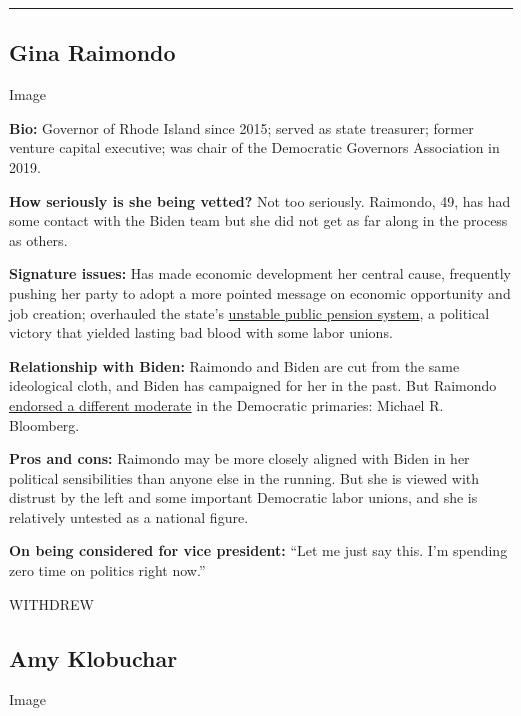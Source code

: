 \begin{center}\rule{0.5\linewidth}{\linethickness}\end{center}

\hypertarget{gina-raimondo}{%
\subsection{Gina Raimondo}\label{gina-raimondo}}

Image

\textbf{Bio:} Governor of Rhode Island since 2015; served as state
treasurer; former venture capital executive; was chair of the Democratic
Governors Association in 2019.

\textbf{How seriously is she being vetted?} Not too seriously. Raimondo,
49, has had some contact with the Biden team but she did not get as far
along in the process as others.

\textbf{Signature issues:} Has made economic development her central
cause, frequently pushing her party to adopt a more pointed message on
economic opportunity and job creation; overhauled the state's
\href{https://www.nytimes.com/2015/09/26/business/dealbook/rhode-island-averts-pension-disaster-without-raising-taxes.html}{unstable
public pension system}, a political victory that yielded lasting bad
blood with some labor unions.

\textbf{Relationship with Biden:} Raimondo and Biden are cut from the
same ideological cloth, and Biden has campaigned for her in the past.
But Raimondo
\href{https://www.nytimes.com/2019/11/24/us/politics/michael-bloomberg-2020-presidency.html}{endorsed
a different moderate} in the Democratic primaries: Michael R. Bloomberg.

\textbf{Pros and cons:} Raimondo may be more closely aligned with Biden
in her political sensibilities than anyone else in the running. But she
is viewed with distrust by the left and some important Democratic labor
unions, and she is relatively untested as a national figure.

\textbf{On being considered for vice president:} ``Let me just say this.
I'm spending zero time on politics right now.''

WITHDREW

\hypertarget{amy-klobuchar}{%
\subsection{Amy Klobuchar}\label{amy-klobuchar}}

Image

